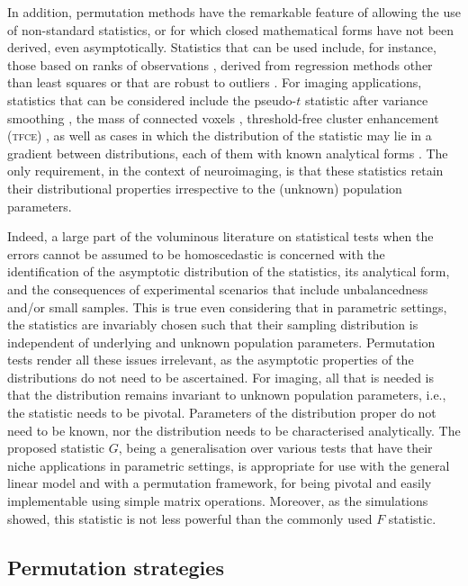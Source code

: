 In addition, permutation methods have the remarkable feature of allowing the use of non-standard statistics, or for which closed mathematical forms have not been derived, even asymptotically. Statistics that can be used include, for instance, those based on ranks of observations \citep{Brunner2000, Rorden2007}, derived from regression methods other than least squares \citep{Cade1996} or that are robust to outliers \citep{Theil1950, Sen1968}. For imaging applications, statistics that can be considered include the pseudo-$t$ statistic after variance smoothing \citep{Holmes1996}, the mass of connected voxels \citep{Bullmore1999}, threshold-free cluster enhancement (\textsc{tfce}) \citep{Smith2009}, as well as cases in which the distribution of the statistic may lie in a gradient between distributions, each of them with known analytical forms \citep{Winkler2012}. The only requirement, in the context of neuroimaging, is that these statistics retain their distributional properties irrespective to the (unknown) population parameters.

Indeed, a large part of the voluminous literature on statistical tests when the errors cannot be assumed to be homoscedastic is concerned with the identification of the asymptotic distribution of the statistics, its analytical form, and the consequences of experimental scenarios that include unbalancedness and/or small samples. This is true even considering that in parametric settings, the statistics are invariably chosen such that their sampling distribution is independent of underlying and unknown population parameters. Permutation tests render all these issues irrelevant, as the asymptotic properties of the distributions do not need to be ascertained. For imaging, all that is needed is that the distribution remains invariant to unknown population parameters, i.e., the statistic needs to be pivotal. Parameters of the distribution proper do not need to be known, nor the distribution needs to be characterised analytically. The proposed statistic $G$, being a generalisation over various tests that have their niche applications in parametric settings, is appropriate for use with the general linear model and with a permutation framework, for being pivotal and easily implementable using simple matrix operations. Moreover, as the simulations showed, this statistic is not less powerful than the commonly used $F$ statistic.

\subsection{Permutation strategies}

